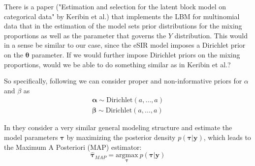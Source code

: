 \documentclass[10pt,a4paper]{article}
\begin{document}
There is a paper ("Estimation and selection for the latent block model on categorical data" by Keribin et al.) that implements the LBM for multinomial data that in the estimation of the model sets prior distributions for the mixing proportions as well as the parameter that governs the $Y$ distribution. This would in a sense be similar to our case, since the eSIR model imposes a Dirichlet prior on the $\boldsymbol{\theta}$ parameter. If we would further impose Dirichlet priors on the mixing proportions, would we be able to do something similar as in Keribin et al.?

So specifically, following \parencite{keribin2015estimation} we can consider proper and non-informative priors for $\alpha$ and $\beta$ as
%
\begin{equation}
	\begin{aligned}
		\boldsymbol{\alpha} \sim \text{Dirichlet}(a, \ldots, a) \\
		\boldsymbol{\beta} \sim \text{Dirichlet}(a, \ldots, a)
	\end{aligned}
\end{equation}
%

In \parencite{keribin2015estimation} they consider a very similar general modeling structure and estimate the model parameters $\boldsymbol{\tau}$ by maximizing the posterior density $p(\boldsymbol{\tau} | \boldsymbol{y})$, which leads to the Maximum A Posteriori (MAP) estimator: 
%
\begin{equation}
	\hat{\boldsymbol{\tau}}_{MAP} = \underset{\boldsymbol{\tau}}{\mathrm{argmax}} \: p(\boldsymbol{\tau} | \boldsymbol{y})
\end{equation}
 
\end{document}
